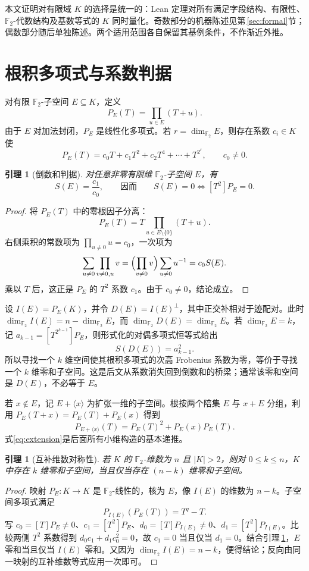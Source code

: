\documentclass[UTF8,a4paper,11pt]{ctexart}
\numberwithin{equation}{section}
\newtheorem{lemma}[theorem]{引理}
\theoremstyle{definition}
\theoremstyle{remark}
\newcommand{\Ftwo}{\mathbb F_2}
\newcommand{\dimf}{\dim_{\Ftwo}}
\begin{document}
本文证明对有限域 $K$ 的选择是统一的：Lean 定理对所有满足字段结构、有限性、$\Ftwo$-代数结构及基数等式的 $K$ 同时量化。奇数部分的机器陈述见第\,\ref{sec:formal}节；偶数部分随后单独陈述。两个适用范围各自保留其基例条件，不作渐近外推。

\section{根积多项式与系数判据}

对有限 $\Ftwo$-子空间 $E\subseteq K$，定义
\[
  P_E(T)=\prod_{u\in E}(T+u).
\]
由于 $E$ 对加法封闭，$P_E$ 是线性化多项式。若 $r=\dimf E$，则存在系数 $c_i\in K$ 使
\[
  P_E(T)=c_0T+c_1T^2+c_2T^4+\cdots+T^{2^r},\qquad c_0\ne0.
\]

\begin{lemma}[倒数和判据]\label{lem:coeff}
对任意非零有限维 $\Ftwo$-子空间 $E$，有
\[
  S(E)=\frac{c_1}{c_0},\qquad\text{因而}\qquad S(E)=0\Longleftrightarrow [T^2]P_E=0.
\]
\end{lemma}
\begin{proof}
将 $P_E(T)$ 中的零根因子分离：
\[
 P_E(T)=T\prod_{u\in E\setminus\{0\}}(T+u).
\]
右侧乘积的常数项为 $\prod_{u\ne0}u=c_0$，一次项为
\[
 \sum_{u\ne0}\prod_{v\ne0,u}v
 =\Bigl(\prod_{v\ne0}v\Bigr)\sum_{u\ne0}u^{-1}=c_0S(E).
\]
乘以 $T$ 后，这正是 $P_E$ 的 $T^2$ 系数 $c_1$。由于 $c_0\ne0$，结论成立。
\end{proof}

设 $I(E)=P_E(K)$，并令 $D(E)=I(E)^\perp$，其中正交补相对于迹配对。此时 $\dimf I(E)=n-\dimf E$，而 $\dimf D(E)=\dimf E$。若 $\dimf E=k$，记 $a_{k-1}=[T^{2^{k-1}}]P_E$，则形式化的对偶多项式恒等式给出
\begin{equation}\label{eq:duality}
 S(D(E))=a_{k-1}^{2}.
\end{equation}
所以寻找一个 $k$ 维空间使其根积多项式的次高 Frobenius 系数为零，等价于寻找一个 $k$ 维零和子空间。这是后文从系数消失回到倒数和的桥梁；通常该零和空间是 $D(E)$，不必等于 $E$。

若 $x\notin E$，记 $E+\langle x\rangle$ 为扩张一维的子空间。根按两个陪集 $E$ 与 $x+E$ 分组，利用 $P_E(T+x)=P_E(T)+P_E(x)$ 得到
\begin{equation}\label{eq:extension}
 P_{E+\langle x\rangle}(T)=P_E(T)^2+P_E(x)P_E(T).
\end{equation}
式\eqref{eq:extension}是后面所有小维构造的基本递推。

\begin{lemma}[互补维数对称性]\label{lem:complement}
若 $K$ 的 $\Ftwo$-维数为 $n$ 且 $|K|>2$，则对 $0\le k\le n$，$K$ 中存在 $k$ 维零和子空间，当且仅当存在 $(n-k)$ 维零和子空间。
\end{lemma}
\begin{proof}
映射 $P_E:K\to K$ 是 $\Ftwo$-线性的，核为 $E$，像 $I(E)$ 的维数为 $n-k$。子空间多项式满足
\[
 P_{I(E)}(P_E(T))=T^q-T.
\]
写 $c_0=[T]P_E\ne0$、$c_1=[T^2]P_E$、$d_0=[T]P_{I(E)}\ne0$、$d_1=[T^2]P_{I(E)}$。比较两侧 $T^2$ 系数得到 $d_0c_1+d_1c_0^2=0$，故 $c_1=0$ 当且仅当 $d_1=0$。结合引理\,\ref{lem:coeff}，$E$ 零和当且仅当 $I(E)$ 零和。又因为 $\dimf I(E)=n-k$，便得结论；反向由同一映射的互补维数等式应用一次即可。
\end{proof}
\end{document}
